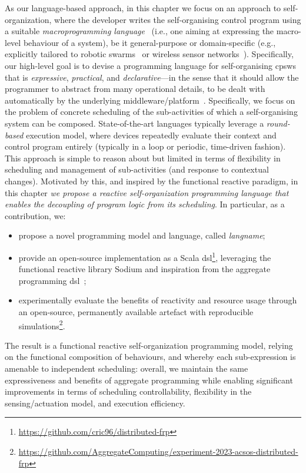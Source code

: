 As our language-based approach, in this chapter we focus on an approach to self-organization,
 where the developer writes the self-organising control program
 using a suitable \emph{macroprogramming language}~\cite{casadei2023macro,DBLP:journals/jisa/JuniorSBP21} (i.e., one aiming at expressing the macro-level behaviour of a system), be it general-purpose or domain-specific (e.g., explicitly tailored to robotic swarms~\cite{DBLP:journals/swarm/BrambillaFBD13} or wireless sensor networks~\cite{DBLP:journals/csur/MottolaP11}).
%
Specifically, our high-level goal
 is to devise a programming language
 for self-organising \acp{cpsw}
 that is \emph{expressive}, \emph{practical},
 and \emph{declarative}---in the sense that it should allow the programmer to abstract from
many operational details, to be dealt with automatically by the underlying middleware/platform~\cite{DBLP:conf/iotdi/NoorTGS19}.
%
Specifically, we focus on the problem of concrete scheduling of the sub-activities of which a self-organising system can be composed.
%
State-of-the-art languages typically leverage a \emph{round-based} execution model,
 where devices repeatedly evaluate their context and control program entirely
(typically in a loop or periodic, time-driven fashion).
%
This approach is simple to reason about but
 limited in terms of flexibility in scheduling
 and management of sub-activities (and response to contextual changes).
%
Motivated by this, and inspired by the functional reactive paradigm,
 in this chapter 
 \emph{we propose a reactive self-organization programming language
 that enables the decoupling of program logic from its scheduling}.
% 
In particular, as a contribution, we:
\begin{itemize}
\item propose a novel programming model and language, called \emph{\ac{langname}};
\item provide an open-source implementation as a Scala \ac{dsl}\footnote{\label{acsos2023-frp:footnote:dsl}\url{https://github.com/cric96/distributed-frp}},
 leveraging the functional reactive library Sodium and 
 inspiration from the \scafi{} aggregate programming \ac{dsl}~\cite{DBLP:journals/softx/CasadeiVAP22,DBLP:journals/lmcs/AudritoCDV23};
\item experimentally evaluate the benefits of reactivity and resource usage
through an open-source, permanently available artefact with reproducible simulations\footnote{\label{acsos2023-frp:footnote:eval}\url{https://github.com/AggregateComputing/experiment-2023-acsos-distributed-frp}}.
\end{itemize}
%
The result is a functional reactive self-organization programming model, 
 relying on the functional composition of behaviours,
and whereby each sub-expression is amenable to independent scheduling:
 overall, we maintain the same expressiveness and benefits of aggregate programming
 while enabling significant improvements in terms of scheduling controllability, 
 flexibility in the sensing/actuation model, and execution efficiency. %
 
